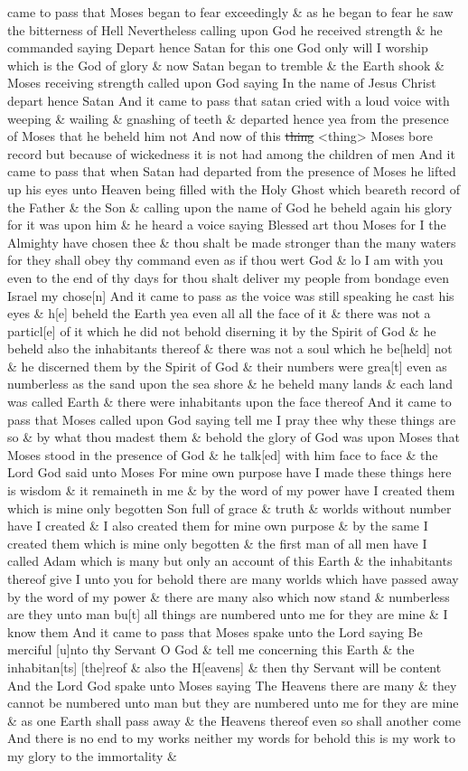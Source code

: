 came to pass that Moses began to fear exceedingly \& as he began to fear he saw the bitterness of Hell Nevertheless calling upon God he received strength \& he commanded saying Depart hence Satan for this one God only will I worship which is the God of glory \& now Satan began to tremble \& the Earth shook \& Moses receiving strength called upon God saying In the name of Jesus Christ depart hence Satan And it came to pass that satan cried with a loud voice with weeping \& wailing \& gnashing of teeth \& departed hence yea from the presence of Moses that he beheld him not And now of this \sout{thing} <thing> Moses bore record but because of wickedness it is not had among the children of men And it came to pass that when Satan had departed from the presence of Moses he lifted up his eyes unto Heaven being filled with the Holy Ghost which beareth record of the Father \& the Son \& calling upon the name of God he beheld again his glory for it was upon him \& he heard a voice saying Blessed art thou Moses for I the Almighty have chosen thee \& thou shalt be made stronger than the many waters for they shall obey thy command even as if thou wert God \& lo I am with you even to the end of thy days for thou shalt deliver my people from bondage even Israel my chose[n] And it came to pass as the voice was still speaking he cast his eyes \& h[e] beheld the Earth yea even all all the face of it \& there was not a particl[e] of it which he did not behold diserning it by the Spirit of God \& he beheld also the inhabitants thereof \& there was not a soul which he be[held] not \& he discerned them by the Spirit of God \& their numbers were grea[t] even as numberless as the sand upon the sea shore \& he beheld many lands \& each land was called Earth \& there were inhabitants upon the face thereof And it came to pass that Moses called upon God saying tell me I pray thee why these things are so \& by what thou madest them \& behold the glory of God was upon Moses that Moses stood in the presence of God \& he talk[ed] with him face to face \& the Lord God said unto Moses For mine own purpose have I made these things here is wisdom \& it remaineth in me \& by the word of my power have I created them which is mine only begotten Son full of grace \& truth \& worlds without number have I created \& I also created them for mine own purpose \& by the same I created them which is mine only begotten \& the first man of all men have I called Adam which is many but only an account of this Earth \& the inhabitants thereof give I unto you for behold there are many worlds which have passed away by the word of my power \& there are many also which now stand \& numberless are they unto man bu[t] all things are numbered unto me for they are mine \& I know them And it came to pass that Moses spake unto the Lord saying Be merciful [u]nto thy Servant O God \& tell me concerning this Earth \& the inhabitan[ts] [the]reof \& also the H[eavens] \& then thy Servant will be content And the Lord God spake unto Moses saying The Heavens there are many \& they cannot be numbered unto man but they are numbered unto me for they are mine \& as one Earth shall pass away \& the Heavens thereof even so shall another come And there is no end to my works neither my words for behold this is my work to my glory to the immortality \& 